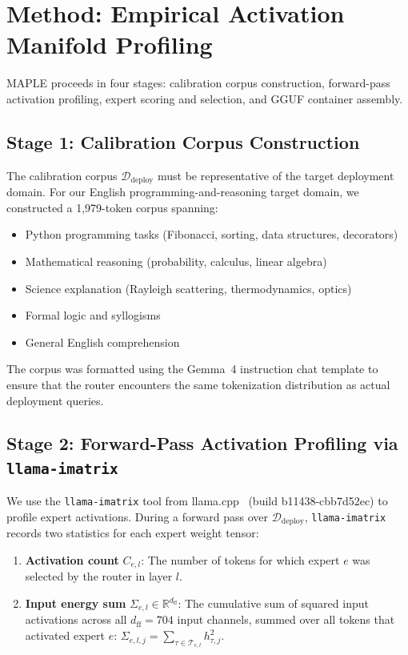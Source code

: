 \documentclass[final]{article}
\newcommand{\MAPLE}{\textsc{MAPLE}}
\newcommand{\R}{\mathbb{R}}
\begin{document}
\section{Method: Empirical Activation Manifold Profiling}
\label{sec:method}

\MAPLE{} proceeds in four stages: calibration corpus construction, forward-pass activation profiling, expert scoring and selection, and GGUF container assembly.

\subsection{Stage 1: Calibration Corpus Construction}

The calibration corpus $\mathcal{D}_\text{deploy}$ must be representative of the target deployment domain. For our English programming-and-reasoning target domain, we constructed a 1,979-token corpus spanning:
\begin{itemize}[leftmargin=1.5em,topsep=2pt,itemsep=1pt]
  \item Python programming tasks (Fibonacci, sorting, data structures, decorators)
  \item Mathematical reasoning (probability, calculus, linear algebra)
  \item Science explanation (Rayleigh scattering, thermodynamics, optics)
  \item Formal logic and syllogisms
  \item General English comprehension
\end{itemize}
The corpus was formatted using the Gemma~4 instruction chat template to ensure that the router encounters the same tokenization distribution as actual deployment queries.

\subsection{Stage 2: Forward-Pass Activation Profiling via \texttt{llama-imatrix}}

We use the \texttt{llama-imatrix} tool from llama.cpp~\cite{llama_cpp} (build b11438-cbb7d52ec) to profile expert activations. During a forward pass over $\mathcal{D}_\text{deploy}$, \texttt{llama-imatrix} records two statistics for each expert weight tensor:

\begin{enumerate}[leftmargin=1.5em,topsep=2pt,itemsep=1pt]
  \item \textbf{Activation count} $C_{e,l}$: The number of tokens for which expert $e$ was selected by the router in layer $l$.
  \item \textbf{Input energy sum} $\Sigma_{e,l} \in \R^{d_\text{ff}}$: The cumulative sum of squared input activations across all $d_\text{ff} = 704$ input channels, summed over all tokens that activated expert $e$: $\Sigma_{e,l,j} = \sum_{\tau \in \mathcal{T}_{e,l}} h_{\tau,j}^2$.
\end{enumerate}
\end{document}
